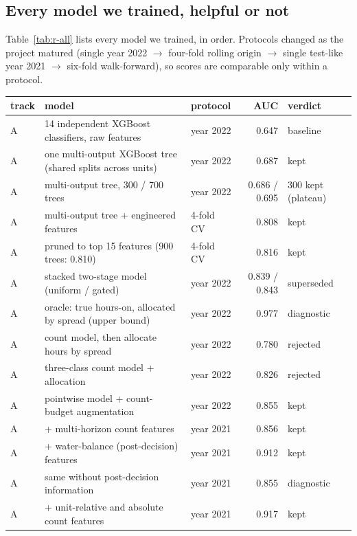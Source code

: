 \documentclass[11pt]{article}
\begin{document}
\subsection{Every model we trained, helpful or not}
\label{sec:pred-all}

Table~\ref{tab:r-all} lists every model we trained, in order. Protocols changed
as the project matured (single year 2022 $\to$ four-fold rolling origin $\to$ single test-like year
2021 $\to$ six-fold walk-forward), so scores are comparable only within a protocol.

\begin{table}[H]
\centering\scriptsize
\begin{tabularx}{\linewidth}{lYlrl}
\toprule
track & model & protocol & AUC & verdict \\
\midrule
A & 14 independent XGBoost classifiers, raw features & year 2022 & 0.647 & baseline \\
A & one multi-output XGBoost tree (shared splits across units) & year 2022 & 0.687 & kept \\
A & multi-output tree, 300 / 700 trees & year 2022 & 0.686 / 0.695 & 300 kept (plateau) \\
A & multi-output tree + engineered features & 4-fold CV & 0.808 & kept \\
A & pruned to top 15 features (900 trees: 0.810) & 4-fold CV & 0.816 & kept \\
A & stacked two-stage model (uniform / gated) & year 2022 & 0.839 / 0.843 & superseded \\
A & oracle: true hours-on, allocated by spread (upper bound) & year 2022 & 0.977 & diagnostic \\
A & count model, then allocate hours by spread & year 2022 & 0.780 & rejected \\
A & three-class count model + allocation & year 2022 & 0.826 & rejected \\
A & pointwise model + count-budget augmentation & year 2022 & 0.855 & kept \\
A & + multi-horizon count features & year 2021 & 0.856 & kept \\
A & + water-balance (post-decision) features & year 2021 & 0.912 & kept \\
A & same without post-decision information & year 2021 & 0.855 & diagnostic \\
A & + unit-relative and absolute count features & year 2021 & 0.917 & kept \\

\end{tabularx}
\end{table}
\end{document}
